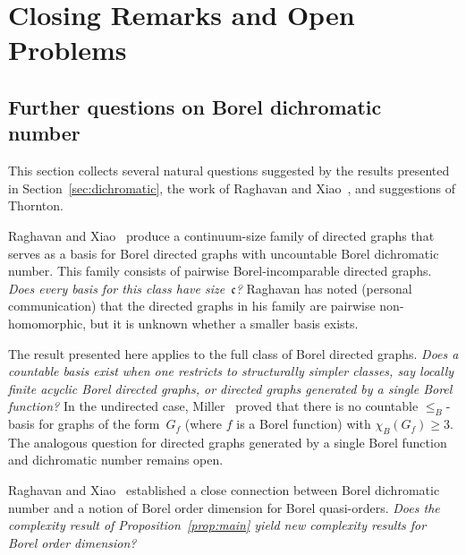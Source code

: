 \chapter{Closing Remarks and Open Problems}\label{ch:closing}

\section{Further questions on Borel dichromatic number}\label{sec:dichrom-questions}
 
This section collects several natural questions suggested by the results presented in Section~\ref{sec:dichromatic}, the work of Raghavan and Xiao~\cite{RaghavanXiao2024}, and suggestions of Thornton.
 
\begin{question}
	Raghavan and Xiao~\cite{RaghavanXiao2024} produce a continuum-size family of directed graphs that serves as a basis for Borel directed graphs with uncountable Borel dichromatic number.
	This family consists of pairwise Borel-incomparable directed graphs.
	\emph{Does every basis for this class have size~$\mathfrak{c}$?}
	Raghavan has noted (personal communication) that the directed graphs in his family are pairwise non-homomorphic, but it is unknown whether a smaller basis exists.
\end{question}

\begin{question}
	The result presented here applies to the full class of Borel directed graphs.
	\emph{Does a countable basis exist when one restricts to structurally simpler classes, say locally finite acyclic Borel directed graphs, or directed graphs generated by a single Borel function?}
	In the undirected case, Miller~\cite{Miller_2008_MeasurableChromaticNumbers} proved that there is no countable $\leq_B$-basis for graphs of the form~$G_f$ (where $f$ is a Borel function) with $\chi_B(G_f)\geq 3$.
	The analogous question for directed graphs generated by a single Borel function and dichromatic number remains open.
\end{question}	

\begin{question}
	Raghavan and Xiao~\cite{RaghavanXiao2024} established a close connection between Borel dichromatic number and a notion of Borel order dimension for Borel quasi-orders.
	\emph{Does the complexity result of Proposition~\ref{prop:main} yield new complexity results for Borel order dimension?}
\end{question}

